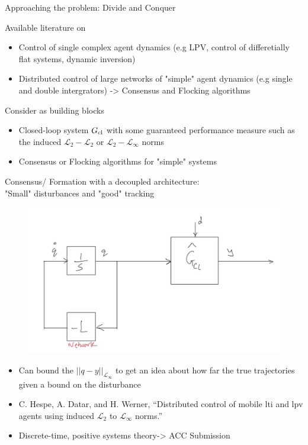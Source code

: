\documentclass{beamer}
\begin{document}
\begin{frame}{Approaching the problem: Divide and Conquer}
\begin{block}{Available literature on}
\begin{itemize}
	\item Control of single complex agent dynamics (e.g LPV, control of differetially flat systems, dynamic inversion) 
	\item Distributed control of large networks of "simple" agent dynamics (e.g single and double intergrators) -> Consensus and Flocking algorithms
\end{itemize}
\end{block}	
\begin{block}{Consider as building blocks}
\begin{itemize}
	\item Closed-loop system $G_{\textnormal{cl}}$ with some guaranteed performance measure such as the induced $\mathcal{L}_2-\mathcal{L}_2$ or  $\mathcal{L}_2-\mathcal{L}_{\infty}$ norms
	\item Consensus or Flocking algorithms for "simple" systems
\end{itemize}
\end{block}
\end{frame}
\begin{frame}{Consensus/ Formation with a decoupled architecture: \\"Small" disturbances and "good" tracking}
\begin{figure}
	\includegraphics[height=0.45\textheight]{figures/cons_decoupled.jpg}
\end{figure}
\begin{itemize}
	\item Can bound the $||q-y||_{\mathcal{L}_{\infty}}$ to get an idea about how far the true trajectories given a bound on the disturbance
	\item C. Hespe, A. Datar, and H. Werner, “Distributed control of mobile lti and lpv agents using induced $\mathcal{L}_2$ to $\mathcal{L}_{\infty}$ norms.”
	\item Discrete-time, positive systems theory-> ACC Submission
\end{itemize}
\end{frame}
\end{document}
